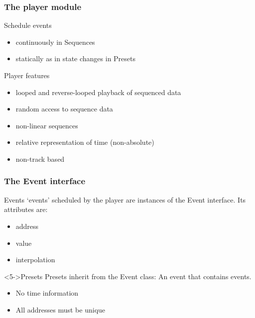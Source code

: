 \documentclass[xcolor=table]{beamer}
\begin{document}
\begin{frame}
  \frametitle{The player module}

  \begin{block}{Schedule events}
    \begin{itemize}
    \item<1-> continuously in Sequences
    \item<1-> statically as in state changes in Presets
    \end{itemize}
  \end{block}
  
  \begin{block}{Player features}
    \begin{itemize}
    \item<2-> looped and reverse-looped playback of sequenced data
    \item<3-> random access to sequence data
    \item<4-> non-linear sequences
    \item<5-> relative representation of time (non-absolute)
    \item<6-> non-track based
    \end{itemize}
  \end{block}
\end{frame}

\begin{frame}
  \frametitle{The Event interface}
  \begin{block}{Events}
    `events' scheduled by the player are instances of the Event interface. Its attributes are:
    \begin{itemize}
    \item<2-> address
    \item<3-> value
    \item<4-> interpolation
    \end{itemize}
  \end{block}
  \begin{block}<5->{Presets}
    Presets inherit from the Event class: An event that contains events.
    \begin{itemize}
    \item<6-> No time information
    \item<7-> All addresses must be unique
    \end{itemize}
  \end{block}
\end{frame}
\end{document}
